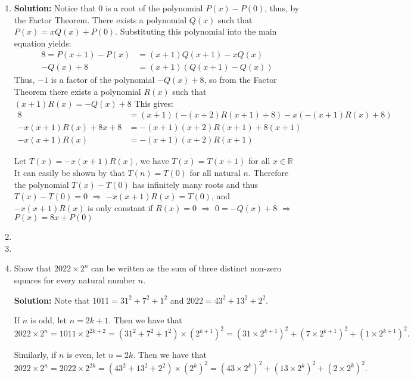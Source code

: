 \documentclass{article}
\begin{document}
\begin{enumerate}[itemsep=24pt]
\item
\textbf{Solution:} Notice that 0 is a root of the polynomial $P(x) - P(0)$, thus, by the Factor Theorem. There exists a polynomial $Q(x)$ such that $P(x) = xQ(x) + P(0)$. Substituting this polynomial into the main equation yields:
\begin{align*}
    8 = P(x+1) - P(x) & = (x+1)Q(x + 1) - xQ(x)\\
            -Q(x) + 8 & = (x+1)(Q(x+1) - Q(x))
\end{align*}
Thus, $-1$ is a factor of the polynomial $-Q(x) + 8$, so from the Factor Theorem there exists a polynomial $R(x)$ such that $(x+1)R(x) = - Q(x) + 8$ This gives:
\begin{align*}
    8 & = (x+1)(-(x+2)R(x+1) + 8) - x(-(x+1)R(x) + 8) \\
    -x(x+1)R(x) + 8x + 8 & = -(x+1)(x+2)R(x+1) + 8(x+1) \\
    -x(x+1)R(x) & = -(x+1)(x+2)R(x+1)
\end{align*}

Let $T(x) = -x(x+1)R(x)$, we have $T(x) = T(x+1)$ for all $x \in \mathbb{R}$ It can easily be shown by that $T(n) = T(0)$ for all natural $n$. Therefore the polynomial $T(x) - T(0)$ has infinitely many roots and thus $T(x) - T(0) = 0$ $\Rightarrow$ $-x(x+1)R(x) = T(0)$, and $-x(x+1)R(x)$ is only constant if $R(x) = 0$ $\Rightarrow$ $0 = -Q(x) + 8$ $\Rightarrow$ $P(x) = 8x + P(0)$

\item 


\item 


\item
Show that $2022 \times 2^n$ can be written as the sum of three distinct non-zero squares for every natural number $n$.

\textbf{Solution:}
Note that $1011 = 31^2 + 7^2 + 1^2$ and $2022 = 43^2 + 13^2 + 2^2$.

If $n$ is odd, let $n = 2k + 1$. Then we have that
\[
    2022 \times 2^n = 1011 \times 2^{2k + 2} = \left( 31^2 + 7^2 + 1^2 \right) \times {\left( 2^{k + 1} \right)}^2 = {\left( 31 \times 2^{k + 1} \right)}^2 + {\left( 7 \times 2^{k + 1} \right)}^2 + {\left( 1 \times 2^{k + 1} \right)}^2.
\]

Similarly, if $n$ is even, let $n = 2k$. Then we have that
\[
    2022 \times 2^n = 2022 \times 2^{2k} = \left( 43^2 + 13^2 + 2^2 \right) \times {\left( 2^{k} \right)}^2 = {\left( 43 \times 2^{k} \right)}^2 + {\left( 13 \times 2^{k} \right)}^2 + {\left( 2 \times 2^{k} \right)}^2.
\]

\end{enumerate}
\end{document}
